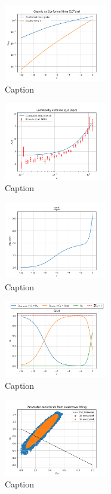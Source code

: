 \begin{figure}
\centering
\includegraphics[width=0.4\textwidth]{../Milestone 1/Plots/cosmic_vs_conformal_time.png}
\caption{Caption}
\label{fig:milestone_1_cosmic_vs_conformal_time}
\end{figure}

\begin{figure}
\centering
\includegraphics[width=0.4\textwidth]{../Milestone 1/Plots/luminosity_distance.png}
\caption{Caption}
\label{fig:milestone_1_luminosity_distance}
\end{figure}

\begin{figure}
\centering
\includegraphics[width=0.4\textwidth]{../Milestone 1/Plots/etaHp_over_c_of_x.png}
\caption{Caption}
\label{fig:milestone_1_etaHp_over_c_of_x}
\end{figure}

\begin{figure}
\centering
\includegraphics[width=0.4\textwidth]{../Milestone 1/Plots/Omega_i_of_x.png}
\caption{Caption}
\label{fig:milestone_1_Omega_i_of_x}
\end{figure}

\begin{figure}
\centering
\includegraphics[width=0.4\textwidth]{../Milestone 1/Plots/supernovafitting_confidence_regions.png}
\caption{Caption}
\label{fig:milestone_1_supernovafitting_confidence_regions}
\end{figure}
